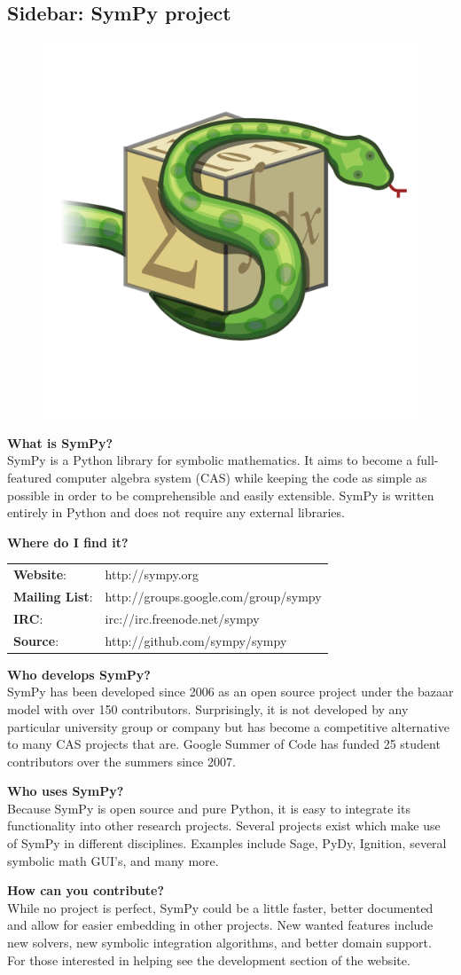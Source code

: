\subsection{Sidebar: SymPy project}
\begin{figure}[h]
\vspace{-0pt}
\centering
\includegraphics[width=.18\textwidth]{images/logo}
\vspace{-0pt}
\label{fig:}
\vspace{00pt}
\end{figure}

\begin{description}
\item {\bf What is SymPy?}\\
SymPy is a Python library for symbolic mathematics\cite{sympy}. 
It aims to become a
full-featured computer algebra system (CAS) while keeping the code as simple as
possible in order to be comprehensible and easily extensible. SymPy is written
entirely in Python and does not require any external libraries.
\item{\bf Where do I find it?}\\
\begin{tabular}{ll}
{\bf Website}: & http://sympy.org \\
{\bf Mailing List}: & http://groups.google.com/group/sympy \\
{\bf IRC}: & irc://irc.freenode.net/sympy \\
{\bf Source}: & http://github.com/sympy/sympy
\end{tabular}
\item {\bf Who develops SymPy?}\\
SymPy has been developed since 2006 as an open source project under the bazaar
model with over 150 contributors.  Surprisingly, it is not developed by any
particular university group or company but has become a competitive alternative
to many CAS projects that are.  Google Summer of Code has funded 25
student contributors over the summers since 2007.
\item{\bf Who uses SymPy?}\\
Because SymPy is open source and pure Python, it is easy to integrate its
functionality into other research projects. Several projects exist which make
use of SymPy in different disciplines. Examples include Sage, PyDy, Ignition,
several symbolic math GUI's, and many more.
\item{\bf How can you contribute?}\\
While no project is perfect, SymPy could be a little faster, better documented
and allow for easier embedding in other projects.  New wanted features
include new solvers, new symbolic integration algorithms, and better domain
support.  For those interested in helping see the development section of the
website.
\end{description}
